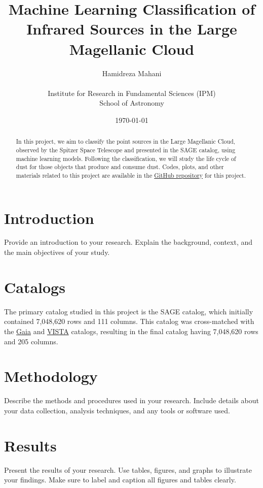 \documentclass[a4paper, 15pt,usenatbib]{article}
\title{Machine Learning Classification of Infrared
Sources in the Large Magellanic Cloud}
\author{Hamidreza Mahani \\
    \\
        Institute for Research in Fundamental Sciences (IPM) \\
        School of Astronomy}
\date{\today}
\begin{document}
\maketitle

\begin{abstract}
    In this project, we aim to classify the point sources in the Large Magellanic Cloud, observed by the Spitzer Space Telescope and presented in the SAGE catalog, using machine learning models. Following the classification, we will study the life cycle of dust for those objects that produce and consume dust. Codes, plots, and other materials related to this project are available in the \href{https://github.com/hmahani/LMC_Machine_Learning}{GitHub repository} for this project.
\end{abstract}

\tableofcontents
\newpage

\section{Introduction}
Provide an introduction to your research. Explain the background, context, and the main objectives of your study. 

\section{Catalogs}
The primary catalog studied in this project is the SAGE catalog, which initially contained 7,048,620 rows and 111 columns. This catalog was cross-matched with the \href{https://vizier.cds.unistra.fr/viz-bin/VizieR-3?-source=I/350&-out.max=50&-out.form=HTML%20Table&-out.add=_r&-out.add=_RAJ,_DEJ&-sort=_r&-oc.form=sexa}{Gaia} \citep{GaiaDR3} and \href{https://vizier.cds.unistra.fr/viz-bin/VizieR-3?-source=II/375&-out.max=50&-out.form=HTML%20Table&-out.add=_r&-out.add=_RAJ,_DEJ&-sort=_r&-oc.form=sexa}{VISTA} \citep{Cioni11_Vista} catalogs, resulting in the final catalog having 7,048,620 rows and 205 columns.

\section{Methodology}
Describe the methods and procedures used in your research. Include details about your data collection, analysis techniques, and any tools or software used.

\section{Results}
Present the results of your research. Use tables, figures, and graphs to illustrate your findings. Make sure to label and caption all figures and tables clearly.
\end{document}
